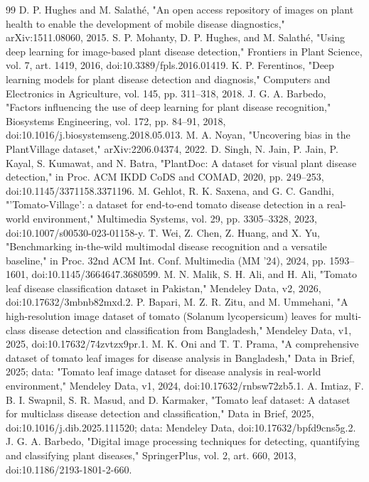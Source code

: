 \documentclass[conference]{IEEEtran}
\begin{document}
\begin{thebibliography}{99}
 D. P. Hughes and M. Salathé, "An open access repository of images on plant health to enable the development of mobile disease diagnostics," arXiv:1511.08060, 2015.
 S. P. Mohanty, D. P. Hughes, and M. Salathé, "Using deep learning for image-based plant disease detection," Frontiers in Plant Science, vol. 7, art. 1419, 2016, doi:10.3389/fpls.2016.01419.
 K. P. Ferentinos, "Deep learning models for plant disease detection and diagnosis," Computers and Electronics in Agriculture, vol. 145, pp. 311--318, 2018.
 J. G. A. Barbedo, "Factors influencing the use of deep learning for plant disease recognition," Biosystems Engineering, vol. 172, pp. 84--91, 2018, doi:10.1016/j.biosystemseng.2018.05.013.
 M. A. Noyan, "Uncovering bias in the PlantVillage dataset," arXiv:2206.04374, 2022.
 D. Singh, N. Jain, P. Jain, P. Kayal, S. Kumawat, and N. Batra, "PlantDoc: A dataset for visual plant disease detection," in Proc. ACM IKDD CoDS and COMAD, 2020, pp. 249--253, doi:10.1145/3371158.3371196.
 M. Gehlot, R. K. Saxena, and G. C. Gandhi, "'Tomato-Village': a dataset for end-to-end tomato disease detection in a real-world environment," Multimedia Systems, vol. 29, pp. 3305--3328, 2023, doi:10.1007/s00530-023-01158-y.
 T. Wei, Z. Chen, Z. Huang, and X. Yu, "Benchmarking in-the-wild multimodal disease recognition and a versatile baseline," in Proc. 32nd ACM Int. Conf. Multimedia (MM '24), 2024, pp. 1593--1601, doi:10.1145/3664647.3680599.
 M. N. Malik, S. H. Ali, and H. Ali, "Tomato leaf disease classification dataset in Pakistan," Mendeley Data, v2, 2026, doi:10.17632/3mbnb82mxd.2.
 P. Bapari, M. Z. R. Zitu, and M. Ummehani, "A high-resolution image dataset of tomato (Solanum lycopersicum) leaves for multi-class disease detection and classification from Bangladesh," Mendeley Data, v1, 2025, doi:10.17632/74zvtzx9pr.1.
 M. K. Oni and T. T. Prama, "A comprehensive dataset of tomato leaf images for disease analysis in Bangladesh," Data in Brief, 2025; data: "Tomato leaf image dataset for disease analysis in real-world environment," Mendeley Data, v1, 2024, doi:10.17632/rnbsw72zb5.1.
 A. Imtiaz, F. B. I. Swapnil, S. R. Masud, and D. Karmaker, "Tomato leaf dataset: A dataset for multiclass disease detection and classification," Data in Brief, 2025, doi:10.1016/j.dib.2025.111520; data: Mendeley Data, doi:10.17632/bpfd9cns5g.2.
 J. G. A. Barbedo, "Digital image processing techniques for detecting, quantifying and classifying plant diseases," SpringerPlus, vol. 2, art. 660, 2013, doi:10.1186/2193-1801-2-660.

\end{thebibliography}
\end{document}
